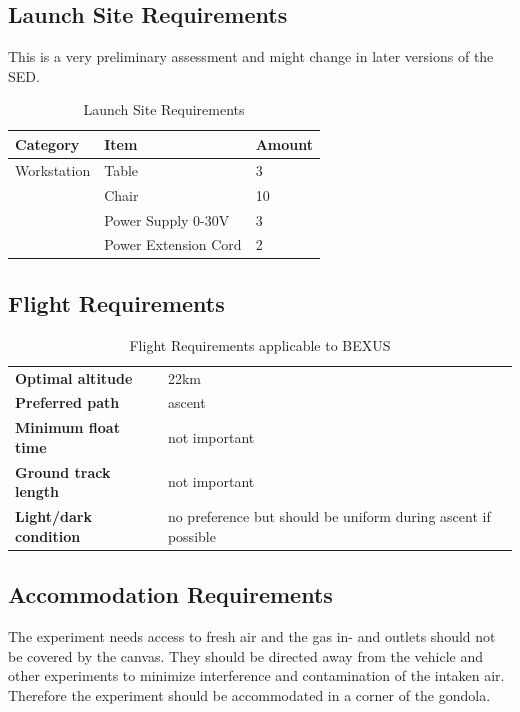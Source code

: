 \documentclass[
  a4paper,
  11pt,
  openany,
  parskip,
  toc=totoc,
  listof=totoc,
  bibliography=totoc
]{scrreprt}
\begin{document}
\subsection{Launch Site Requirements}
This is a very preliminary assessment and might change in later versions of the SED.
\begin{table}[htbp]
\centering
\caption{Launch Site Requirements}
\label{tab:launch_site_req}
\begin{tabular}{lll}
\toprule
\textbf{Category} & \textbf{Item} & \textbf{Amount} \\
\midrule
Workstation&Table & 3 \\
 &Chair & 10 \\
 &Power Supply 0-30V & 3\\
 &Power Extension Cord & 2 \\

\bottomrule
\end{tabular}
\end{table}
\clearpage

\subsection{Flight Requirements}
\begin{table}[htbp]
\centering
\caption{Flight Requirements applicable to BEXUS}
\label{tab:flight_req_bexus}
\begin{tabular}{p{5cm} p{10cm}}
\toprule
\textbf{Optimal altitude} & 22km \\
\textbf{Preferred path} & ascent \\
\textbf{Minimum float time} & not important\\
\textbf{Ground track length} & not important\\
\textbf{Light/dark condition} & no preference but should be uniform during ascent if possible\\
\bottomrule
\end{tabular}
\end{table}
\clearpage

\subsection{Accommodation Requirements}

The experiment needs access to fresh air and the gas in- and outlets should not be covered by the canvas. They should be directed away from the vehicle and other experiments to minimize interference and contamination of the intaken air. Therefore the experiment should be accommodated in a corner of the gondola.
\end{document}
